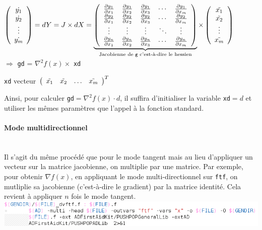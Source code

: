 $\left( 
\begin{array}{c} 
\dot{y_1} \\
\dot{y_2} \\
\vdots \\
\dot{y_m}

\end{array}
\right)
=dY = J \times dX =
\underbrace{
\left( 
\begin{array}{ccccc} 
\frac{\partial y_1}{\partial x_1} & \frac{\partial y_1}{\partial x_2} &
 \frac{\partial y_1}{\partial x_3} & \cdots & \frac{\partial y_1}{\partial x_m} \\
\frac{\partial y_2}{\partial x_1} & \frac{\partial y_2}{\partial x_2} &
 \frac{\partial y_2}{\partial x_3} & \cdots & \frac{\partial y_2}{\partial x_m} \\
\vdots & \vdots & \vdots & \ddots & \vdots \\
\frac{\partial y_n}{\partial x_1} & \frac{\partial y_n}{\partial x_2} &
 \frac{\partial y_n}{\partial x_3} & \cdots & \frac{\partial y_n}{\partial x_m} \\
\end{array}
\right)}_{\text{Jacobienne de {\tt g} c'est-à-dire le hessien}}
 \times
\left( 
\begin{array}{c} 
\Tilde{x_1} \\
\Tilde{x_2} \\
\vdots \\
\Tilde{x_m}
\end{array}
\right)
 $ \\
$\Longrightarrow$ {\tt gd} = $\nabla^2 f(x)\times$ {\tt xd} 




 {\tt xd} vecteur $\left(\begin{array}{cccc} 
\Tilde{x_1} &
\Tilde{x_2} &
\hdots &
\Tilde{x_m}
\end{array}\right)^T$


Ainsi, pour calculer {\tt gd}$=\nabla^2f(x)\cdot d$, il suffira d'initialiser la variable {\tt xd}$=d$ et utiliser
les mêmes paramètres que l'appel à la fonction standard.



\paragraph{Mode multidirectionnel} \hfill \\

Il s'agit du même procédé que pour le mode tangent mais au lieu d'appliquer un vecteur sur la matrice jacobienne,
on multiplie par une matrice. Par exemple, pour obtenir $\nabla f(x)$, en appliquant le mode multi-directionnel
sur {\tt ftf}, on mutliplie sa jacobienne (c'est-à-dire le gradient) par la matrice identité. Cela revient à appliquer
$n$ fois le mode tangent.\\
\includegraphics[scale=0.7]{code/multi.png}

